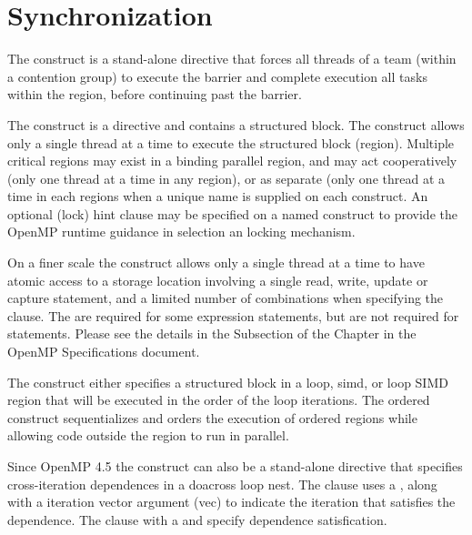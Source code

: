 \pagebreak
\chapter{Synchronization}
\label{chap:synchronization}

The  construct is a stand-alone directive that forces all threads
of a team (within a contention group) to execute the barrier and complete
execution all tasks within the region, before continuing past the barrier.

The  construct is a directive and contains a structured block. 
The construct allows only a single thread at a time to execute the structured block (region).
Multiple critical regions may exist in a binding parallel region, and may
act cooperatively (only one thread at a time in any  region),
or as separate (only one thread at a time in each  regions when
a unique name is supplied on each  construct.
An optional (lock) hint clause may be specified on a named  
construct to provide the OpenMP runtime guidance in selection an locking 
mechanism.

On a finer scale the  construct allows only a single thread at 
a time to have atomic access to a storage location involving a single read, 
write, update or capture statement, and a limited number of combinations 
when specifying the   clause.  The 
are required for some expression statements, but are not required for 
 statements. Please see the details in the  
Subsection of the  Chapter in the OpenMP Specifications document.

The  construct either specifies a structured block in a loop, 
simd, or loop SIMD region that will be executed in the order of the loop 
iterations.  The ordered construct sequentializes and orders the execution 
of ordered regions while allowing code outside the region to run in parallel.

Since OpenMP 4.5 the  construct can also be a stand-alone 
directive that specifies cross-iteration dependences in a doacross loop nest.  
The  clause uses a  , along with a 
iteration vector argument (vec) to indicate the iteration that satisfies the 
dependence.  The  clause with a  and 
 specify dependence satisfication. 

